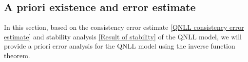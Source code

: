

\subsection{A priori existence and error estimate}
\label{sec: priori_qnll_ncg}

In this section, based on the consistency error estimate \eqref{QNLL consistency error estimate} and stability analysis \eqref{Result of stability} of the QNLL model, we will provide a priori error analysis for the QNLL model using the inverse function theorem.

